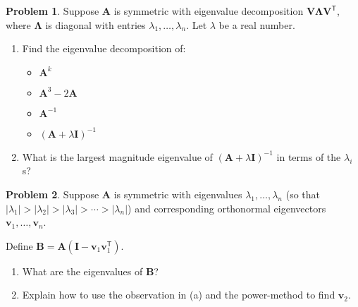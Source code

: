 \documentclass[12pt]{article}
\theoremstyle{definition}
\newtheorem{problem}{Problem}
\renewcommand{\vec}{\mathbf}
\newcommand{\T}{\mathsf{T}}
\begin{document}
\begin{problem}
Suppose $\vec{A}$ is symmetric with eigenvalue decomposition $\vec{V}\vec{\Lambda}\vec{V}^\T$, where $\vec{\Lambda}$ is diagonal with entries $\lambda_1, \ldots, \lambda_n$.
Let $\lambda$ be a real number.

\begin{enumerate}
    \item 
Find the eigenvalue decomposition of:
\begin{itemize}
\item $\vec{A}^k$    
\item $\vec{A}^3 -2 \vec{A}$
\item $\vec{A}^{-1}$
\item $(\vec{A}+\lambda \vec{I})^{-1}$
\end{itemize}
\item What is the largest magnitude eigenvalue of $(\vec{A}+\lambda\vec{I})^{-1}$ in terms of the $\lambda_i$s?
\end{enumerate}
\end{problem}


\begin{problem}
    Suppose $\vec{A}$ is symmetric with eigenvalues $\lambda_1, \ldots, \lambda_n$ (so that $|\lambda_1| > |\lambda_2| > |\lambda_3| > \cdots > |\lambda_n|$) and corresponding orthonormal eigenvectors $\vec{v}_1, \ldots, \vec{v}_n$.

    Define $\vec{B} = \vec{A}(\vec{I} - \vec{v}_1\vec{v}_1^\T)$. 

    \begin{enumerate}
        \item What are the eigenvalues of $\vec{B}$?

        \item Explain how to use the observation in (a) and the power-method to find $\vec{v}_2$.

    \end{enumerate}

\end{problem}
\end{document}

